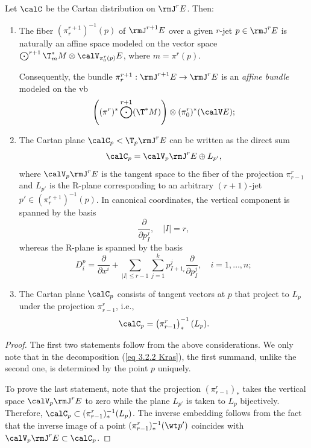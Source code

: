 \begin{thm}\label{thm 3.2.1 Kras}
    Let $\calC$ be the Cartan distribution on $\rmJ^rE$. Then:
    \begin{enumerate}
        \item The fiber $(\pi^{r+1}_{r})^{-1}(p)$ of $\rmJ^{r+1}E$ over a given $r$-jet $p\in \rmJ^rE$ is naturally an affine space modeled on the vector space $\bigodot^{r+1}\T^\ast_m M\otimes \calV_{\pi^r_0(p)}E$, where $m=\pi^r(p)$. 
        
        Consequently, the bundle $\pi^{r+1}_r:\rmJ^{r+1}E\to \rmJ^rE$ is an \emph{affine bundle} modeled on the \gls{vb} 
        \[\left((\pi^r)^\ast \bigodot^{r+1}(\T^\ast M)\right)\otimes (\pi^r_0)^\ast (\calV E);\]        
        \item The Cartan plane $\calC_p<\T_p \rmJ^rE$ can be written as the direct sum
        \[\calC_p=\calV_p\rmJ^rE\oplus L_{p'},\label{eq 3.2.2 Kras}\]
        where $\calV_p\rmJ^rE$ is the tangent space to the fiber of the projection $\pi^r_{r-1}$ and $L_{p'}$ is the R-plane corresponding to an arbitrary $(r+1)$-jet $p'\in(\pi^{r+1}_r)^{-1}(p)$. In canonical coordinates, the vertical component is spanned by the basis
        \[\frac{\partial}{\partial p^j_{I}}, \quad |I|=r,\] 
        whereas the R-plane is spanned by the basis
        \[D^p_i=\frac{\partial}{\partial x^i}+\sum_{|I|\leq r-1}\sum_{j=1}^k p^j_{I+1_i}\frac{\partial}{\partial p^j_I},\quad i=1,\ldots,n;\]
        \item The Cartan plane $\calC_p$ consists of tangent vectors at $p$ that project to $L_p$ under the projection $\pi^r_{r-1}$, i.e.,
        \[\calC_p=\left(\pi^r_{r-1}\right)_\ast^{-1}(L_p).\]
    \end{enumerate}
\end{thm}
\begin{proof}
    The first two statements follow from the above considerations. We only note that in the decomposition (\ref{eq 3.2.2 Kras}), the first summand, unlike the second one, is determined by the point $p$ uniquely.

    To prove the last statement, note that the projection $(\pi^r_{r-1})_\ast$ takes the vertical space $\calV_p\rmJ^rE$ to zero while the plane $L_{p'}$ is taken to $L_p$ bijectively. Therefore, $\calC_p\subset (\pi^r_{r-1})^{-1}_\ast(L_p)$. The inverse embedding follows from the fact that the inverse image of a point $(\pi^r_{r-1})^{-1}_\ast(\wt p')$ coincides with $\calV_p\rmJ^rE\subset\calC_p$.
\end{proof}

